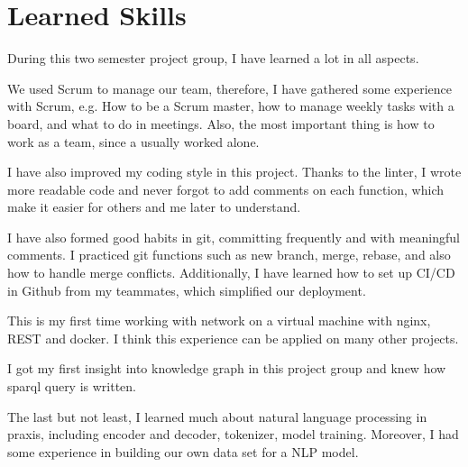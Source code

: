 
\section{Learned Skills}

During this two semester project group,
I have learned a lot in all aspects. 

We used Scrum to manage our team,
therefore, I have gathered some experience with Scrum, 
e.g. How to be a Scrum master, 
how to manage weekly tasks with a board, 
and what to do in meetings. 
Also, the most important thing is how to work as a team, 
since a usually worked alone. 

I have also improved my coding style in this project. 
Thanks to the linter, 
I wrote more readable code and never forgot to add comments on each function, 
which make it easier for others and me later to understand.

I have also formed good habits in git, 
committing frequently and with meaningful comments. 
I practiced git functions such as new branch, merge, rebase, 
and also how to handle merge conflicts. 
Additionally, I have learned how to set up CI/CD in Github from my teammates, 
which simplified our deployment.

This is my first time working with network on a virtual machine
with nginx, REST and docker. 
I think this experience can be applied on many other projects. 

I got my first insight into knowledge graph in this project group
and knew how sparql query is written. 

The last but not least,
I learned much about natural language processing in praxis, 
including encoder and decoder, tokenizer, model training. 
Moreover, I had some experience in building our own data set for a NLP model. 